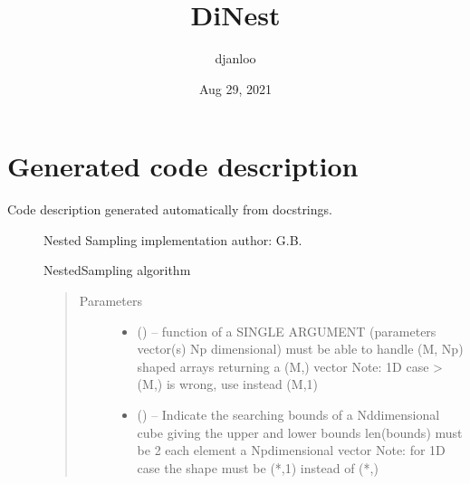 \documentclass[letterpaper,10pt,english]{sphinxmanual}
\title{DiNest}
\date{Aug 29, 2021}
\author{djanloo}
\begin{document}
\pagestyle{empty}
\sphinxmaketitle
\pagestyle{plain}
\sphinxtableofcontents
\pagestyle{normal}
\label{\detokenize{index::doc}}



\chapter{Generated code description}
\label{\detokenize{autogen:generated-code-description}}\label{\detokenize{autogen::doc}}\begin{description}
\item[{Code description generated automatically from docstrings.}] \leavevmode{}\label{\detokenize{autogen:module-my_NS}}
Nested Sampling implementation
author: G.B.

\begin{fulllineitems}
\label{\detokenize{autogen:my_NS.NS}}
NestedSampling algorithm
\begin{quote}\begin{description}
\item[{Parameters}] \leavevmode\begin{itemize}
\item {} 
 () – function of a SINGLE ARGUMENT (parameters vector(s) Np \sphinxhyphen{} dimensional)
must be able to handle (M, Np) shaped arrays
returning a (M,) vector
Note: 1D case \sphinxhyphen{}> (M,) is wrong, use instead (M,1)

\item {} 
 () – 
Indicate the searching bounds of a Nd\sphinxhyphen{}dimensional cube giving the upper and lower bounds
len(bounds) must be 2
each element a Np\sphinxhyphen{}dimensional vector
Note: for 1D case the shape must be (*,1) instead of (*,)
\begin{quote}


\end{quote}
\end{itemize}
\end{description}
\end{quote}
\end{fulllineitems}
\end{description}
\end{document}
